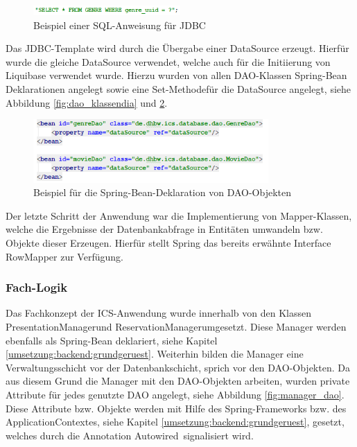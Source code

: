 \begin{figure}[H]
	\centering 
	\includegraphics[width=0.5\textwidth]{img/select_beispiel}
	\captionsetup{format=hang}
	\caption[Beispiel einer SQL-Anweisung für \ac{JDBC}]{\label{fig:select_beispiel}Beispiel einer SQL-Anweisung für \ac{JDBC}}
\end{figure}

Das \ac{JDBC}-Template wird durch die Übergabe einer DataSource erzeugt. Hierfür wurde die gleiche DataSource verwendet, welche auch für die Initiierung von Liquibase verwendet wurde. Hierzu wurden von allen  \ac{DAO}-Klassen Spring-Bean Deklarationen angelegt sowie eine \glqq Set-Methode\grqq für die DataSource angelegt, siehe Abbildung \ref{fig:dao_klassendia} und \ref{fig:dao_spring}.

\begin{figure}[H]
	\centering 
	\includegraphics[width=0.8\textwidth]{img/dao_spring}
	\captionsetup{format=hang}
	\caption[Beispiel für die Spring-Bean-Deklaration von \ac{DAO}-Objekten]{\label{fig:dao_spring}Beispiel für die Spring-Bean-Deklaration von \ac{DAO}-Objekten}
\end{figure}	

Der letzte Schritt der Anwendung war die Implementierung von Mapper-Klassen, welche die Ergebnisse der Datenbankabfrage in Entitäten umwandeln bzw. Objekte dieser Erzeugen. Hierfür stellt Spring das bereits erwähnte Interface RowMapper zur Verfügung. 

\subsubsection{Fach-Logik}

Das Fachkonzept der \ac{ICS}-Anwendung wurde innerhalb von den Klassen \glqq PresentationManager\grqq und \glqq ReservationManager\grqq umgesetzt. Diese Manager werden ebenfalls als Spring-Bean deklariert, siehe Kapitel \ref{umsetzung:backend:grundgeruest}. Weiterhin bilden die Manager eine Verwaltungsschicht vor der Datenbankschicht, sprich vor den \ac{DAO}-Objekten. Da aus diesem Grund die Manager mit den \ac{DAO}-Objekten arbeiten, wurden private Attribute für jedes genutzte \ac{DAO} angelegt, siehe Abbildung \ref{fig:manager_dao}. Diese Attribute bzw. Objekte werden mit Hilfe des Spring-Frameworks bzw. des ApplicationContextes, siehe Kapitel \ref{umsetzung:backend:grundgeruest}, gesetzt, welches durch die Annotation \glqq Autowired\grqq \, signalisiert wird. 

